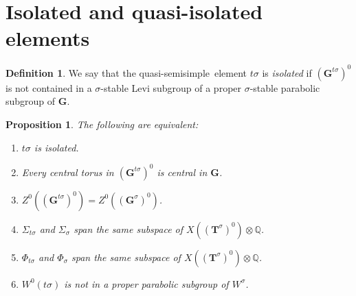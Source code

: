 \documentclass{amsart}
\newtheorem{proposition}[equation]{Proposition}
\numberwithin{equation}{section}
\theoremstyle{definition}
\newtheorem{definition}[equation]{Definition}
\theoremstyle{remark}
\newcommand\bG{{\mathbf G}}
\newcommand\bT{{\mathbf T}}
\newcommand\BQ{{\mathbb Q}}
\newcommand\Gtso{{(\bG^{t\sigma})^0}}
\newcommand\Gs{{\bG^\sigma}}
\newcommand\Gso{{(\Gs)^0}}
\newcommand\Tso{{(\bT^\sigma)^0}}
\newcommand\qss{quasi-semisimple}
\begin{document}
\section{Isolated and quasi-isolated elements}
\begin{definition}
We say that the \qss\ element $t\sigma$ is {\em isolated}
if $\Gtso$ is not contained in a $\sigma$-stable Levi subgroup of 
a proper $\sigma$-stable parabolic subgroup of $\bG$.
\end{definition}
\begin{proposition}\label{isolated}The following are equivalent:
\begin{enumerate}
\item $t\sigma$ is isolated.
\item Every central torus in $\Gtso$ is central in $\bG$.
\item $Z^0(\Gtso)=Z^0(\Gso)$.
\item $\Sigma_{t\sigma}$ and $\Sigma_\sigma$ span the same subspace of
$X(\Tso)\otimes \BQ$.
\item[(4')] $\Phi_{t\sigma}$ and  $\Phi_\sigma$ span the same subspace of
$X(\Tso)\otimes \BQ$.
\item $W^0(t\sigma)$ is not in a proper parabolic subgroup of $W^\sigma$.
\end{enumerate}
\end{proposition}
\end{document}
